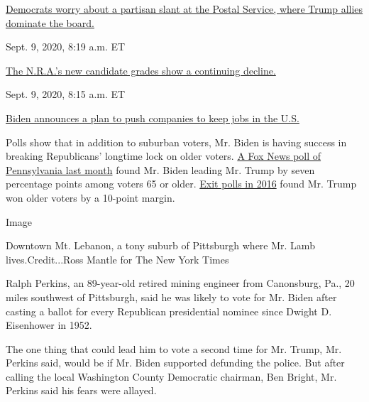 \href{https://www.nytimes3xbfgragh.onion/live/2020/09/09/us/trump-vs-biden\#democrats-worry-about-a-partisan-slant-at-the-postal-service-where-trump-allies-dominate-the-board}{Democrats
worry about a partisan slant at the Postal Service, where Trump allies
dominate the
board.}\href{https://www.nytimes3xbfgragh.onion/live/2020/09/09/us/trump-vs-biden\#the-nras-new-candidate-grades-show-a-continuing-decline}{}

Sept. 9, 2020, 8:19 a.m. ET

\href{https://www.nytimes3xbfgragh.onion/live/2020/09/09/us/trump-vs-biden\#the-nras-new-candidate-grades-show-a-continuing-decline}{The
N.R.A.'s new candidate grades show a continuing
decline.}\href{https://www.nytimes3xbfgragh.onion/live/2020/09/09/us/trump-vs-biden\#biden-announces-a-plan-to-push-companies-to-keep-jobs-in-the-us}{}

Sept. 9, 2020, 8:15 a.m. ET

\href{https://www.nytimes3xbfgragh.onion/live/2020/09/09/us/trump-vs-biden\#biden-announces-a-plan-to-push-companies-to-keep-jobs-in-the-us}{Biden
announces a plan to push companies to keep jobs in the U.S.}

Polls show that in addition to suburban voters, Mr. Biden is having
success in breaking Republicans' longtime lock on older voters.
\href{https://static.foxnews.com/foxnews.com/content/uploads/2020/07/Fox_July-18-20-2020_Complete_Pennsylvania_Topline_July-23-Release.pdf}{A
Fox News poll of Pennsylvania last month} found Mr. Biden leading Mr.
Trump by seven percentage points among voters 65 or older.
\href{https://www.cnn.com/election/2016/results/exit-polls/pennsylvania/president}{Exit
polls in 2016} found Mr. Trump won older voters by a 10-point margin.

Image

Downtown Mt. Lebanon, a tony suburb of Pittsburgh where Mr. Lamb
lives.Credit...Ross Mantle for The New York Times

Ralph Perkins, an 89-year-old retired mining engineer from Canonsburg,
Pa., 20 miles southwest of Pittsburgh, said he was likely to vote for
Mr. Biden after casting a ballot for every Republican presidential
nominee since Dwight D. Eisenhower in 1952.

The one thing that could lead him to vote a second time for Mr. Trump,
Mr. Perkins said, would be if Mr. Biden supported defunding the police.
But after calling the local Washington County Democratic chairman, Ben
Bright, Mr. Perkins said his fears were allayed.

